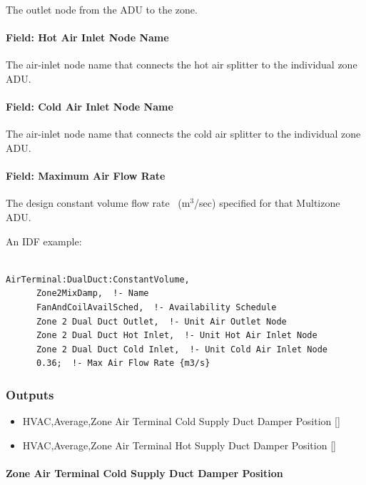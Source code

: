 The outlet node from the ADU to the zone.

\paragraph{Field: Hot Air Inlet Node Name}\label{field-hot-air-inlet-node-name}

The air-inlet node name that connects the hot air splitter to the individual zone ADU.

\paragraph{Field: Cold Air Inlet Node Name}\label{field-cold-air-inlet-node-name}

The air-inlet node name that connects the cold air splitter to the individual zone ADU.

\paragraph{Field: Maximum Air Flow Rate}\label{field-maximum-air-flow-rate-7}

The design constant volume flow rate~ (m\(^{3}\)/sec) specified for that Multizone ADU.

An IDF example:

\begin{lstlisting}

AirTerminal:DualDuct:ConstantVolume,
      Zone2MixDamp,  !- Name
      FanAndCoilAvailSched,  !- Availability Schedule
      Zone 2 Dual Duct Outlet,  !- Unit Air Outlet Node
      Zone 2 Dual Duct Hot Inlet,  !- Unit Hot Air Inlet Node
      Zone 2 Dual Duct Cold Inlet,  !- Unit Cold Air Inlet Node
      0.36;  !- Max Air Flow Rate {m3/s}
\end{lstlisting}

\subsubsection{Outputs}\label{outputs-12}

\begin{itemize}
\item
  HVAC,Average,Zone Air Terminal Cold Supply Duct Damper Position {[]}
\item
  HVAC,Average,Zone Air Terminal Hot Supply Duct Damper Position {[]}
\end{itemize}

\paragraph{Zone Air Terminal Cold Supply Duct Damper Position}\label{zone-air-terminal-cold-supply-duct-damper-position}

